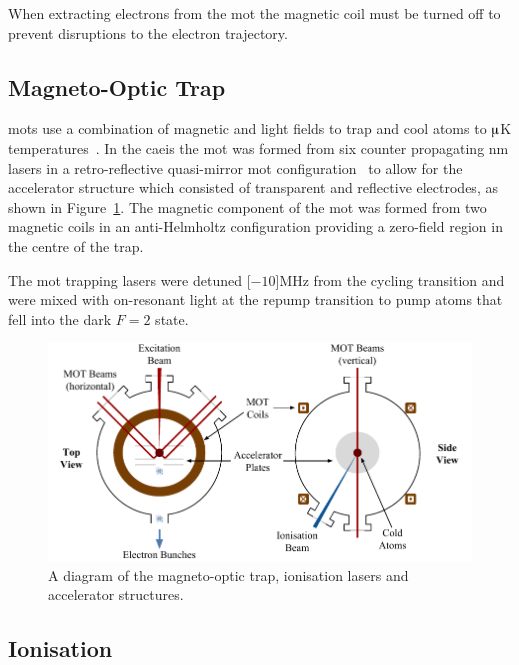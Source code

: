When extracting electrons from the \gls{mot} the magnetic coil must be turned off to prevent disruptions to the electron trajectory.

\subsection{Magneto-Optic Trap}
\Glspl{mot} use a combination of magnetic and light fields to trap and cool atoms to $\muup$K temperatures~\cite{metcalf_laser_1999}.
In the \gls{caeis} the \gls{mot} was formed from six counter propagating \unit[780]{nm} lasers in a retro-reflective quasi-mirror \gls{mot} configuration~\cite{hanssen_using_2006,mcculloch_generation_2013} to allow for the accelerator structure which consisted of transparent and reflective electrodes, as shown in Figure~\ref{figure:mot}.
The magnetic component of the \gls{mot} was formed from two magnetic coils in an anti-Helmholtz configuration providing a zero-field region in the centre of the trap.

The \gls{mot} trapping lasers were detuned \unit[$-10$]{MHz} from the cycling transition and were mixed with on-resonant light at the repump transition to pump atoms that fell into the dark $F=2$ state.

\begin{figure}
    \center
    \includegraphics[width=145mm]{part2/Figs/MOTdiagram.pdf}
    \caption[A diagram of the magneto-optic trap.]{A diagram of the magneto-optic trap, ionisation lasers and accelerator structures.}
    \label{figure:mot}
\end{figure}

\subsection{Ionisation}\label{section:two_stage_ionisation}

